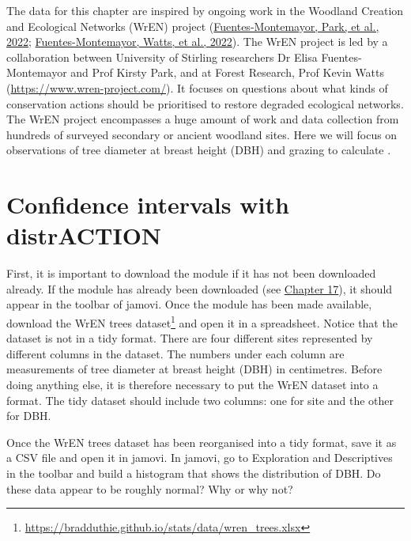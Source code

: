 \documentclass[
  openany]{krantz}
\begin{document}
The data for this chapter are inspired by ongoing work in the Woodland Creation and Ecological Networks (WrEN) project (\protect\hyperlink{ref-Fuentes-Montemayor2022}{Fuentes-Montemayor, Park, et al., 2022}; \protect\hyperlink{ref-Fuentes-Montemayor2022a}{Fuentes-Montemayor, Watts, et al., 2022}).
The WrEN project is led by a collaboration between University of Stirling researchers Dr Elisa Fuentes-Montemayor and Prof Kirsty Park, and at Forest Research, Prof Kevin Watts (\url{https://www.wren-project.com/}).
It focuses on questions about what kinds of conservation actions should be prioritised to restore degraded ecological networks.
The WrEN project encompasses a huge amount of work and data collection from hundreds of surveyed secondary or ancient woodland sites.
Here we will focus on observations of tree diameter at breast height (DBH) and grazing to calculate .

\hypertarget{confidence-intervals-with-distraction}{%
\section{Confidence intervals with distrACTION}\label{confidence-intervals-with-distraction}}

First, it is important to download the  module if it has not been downloaded already.
If the  module has already been downloaded (see \protect\hyperlink{Chapter_17}{Chapter 17}), it should appear in the toolbar of jamovi.
Once the  module has been made available, download the WrEN trees dataset\footnote{\url{https://bradduthie.github.io/stats/data/wren_trees.xlsx}} and open it in a spreadsheet.
Notice that the dataset is not in a tidy format.
There are four different sites represented by different columns in the dataset.
The numbers under each column are measurements of tree diameter at breast height (DBH) in centimetres.
Before doing anything else, it is therefore necessary to put the WrEN dataset into a  format.
The tidy dataset should include two columns: one for site and the other for DBH.

Once the WrEN trees dataset has been reorganised into a tidy format, save it as a CSV file and open it in jamovi.
In jamovi, go to Exploration and Descriptives in the toolbar and build a histogram that shows the distribution of DBH.
Do these data appear to be roughly normal?
Why or why not?
\end{document}
